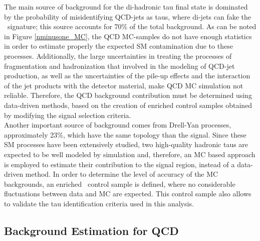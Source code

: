 The main source of background for the di-hadronic tau final state is 
dominated by the probability of misidentifying QCD-jets as taus, where 
di-jets can fake the \Zprimetotauh~signature; this source accounts 
for 70$\%$ of the total background. As can be noted 
in Figure \ref{nminusone_MC}, the QCD MC-samples do
not have enough statistics in order to estimate properly 
the expected SM contamination due to these processes. Additionally, the large uncertainties in 
treating the processes of fragmentation and hadronization that involved in the modeling of QCD-jet 
production, as well as the uncertainties of the pile-up effects and the interaction of the jet products with
the detector material, make QCD MC simulation not reliable. Therefore, the
QCD background contribution must be determined using data-driven methods, based on 
the creation of enriched control samples obtained by modifying the signal selection
criteria. \\

\noindent Another important source of background comes 
from Drell-Yan processes, approximately 23$\%$, 
which have the same topology than the signal. Since these SM 
processes have been extensively studied, two high-quality 
hadronic taus are expected to be well modeled by simulation and, therefore, 
an MC based approach is employed to estimate their contribution 
to the signal region, instead of a data-driven method. In order to 
determine the level of accuracy of the MC backgrounds, 
an enriched \Ztotauh~control sample is defined, where no
considerable fluctuations between data and MC are expected. This control 
sample also allows to validate the tau identification 
criteria used in this analysis.

\subsection{Background Estimation for QCD}
\label{subsec:QCD}

